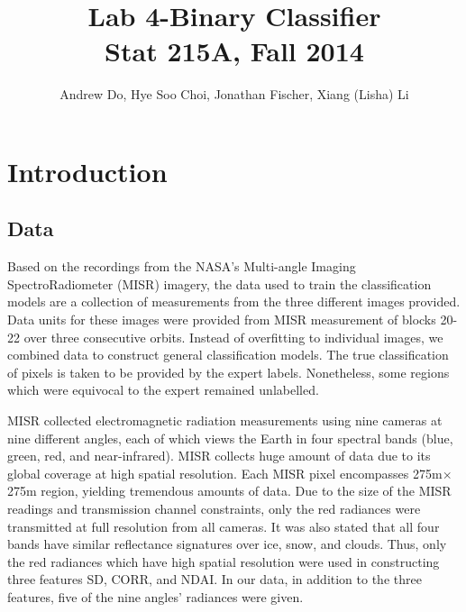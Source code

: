 \documentclass{article}\usepackage[]{graphicx}\usepackage[]{color}
\begin{document}
\title{Lab 4-Binary Classifier\\
Stat 215A, Fall 2014}

\author{Andrew Do, Hye Soo Choi, Jonathan Fischer, Xiang (Lisha) Li }

\maketitle
\section{Introduction}
\subsection{Data} Based on the recordings from the NASA's Multi-angle Imaging SpectroRadiometer (MISR) imagery, the data used to train the classification models are a collection of measurements from the three different images provided. Data units for these images were provided from MISR measurement of blocks 20-22 over three consecutive orbits. Instead of overfitting to individual images, we combined data to construct general classification models. The true classification of pixels is taken to be provided by the expert labels. Nonetheless, some regions which were equivocal to the expert remained unlabelled.

MISR collected electromagnetic radiation measurements using nine cameras at nine different angles, each of which views the Earth in four spectral bands (blue, green, red, and near-infrared).  MISR collects huge amount of data due to its global coverage at high spatial resolution. Each MISR pixel encompasses 275m$\times$275m region, yielding tremendous amounts of data. Due to the size of the MISR readings and transmission channel constraints, only the red radiances were transmitted at full resolution from all cameras. It was also stated that all four bands have similar reflectance signatures over ice, snow, and clouds. Thus, only the red radiances which have high spatial resolution were used in constructing three features SD, CORR, and NDAI.  In our data, in addition to the three features, five of the nine angles' radiances were given.
\end{document}
